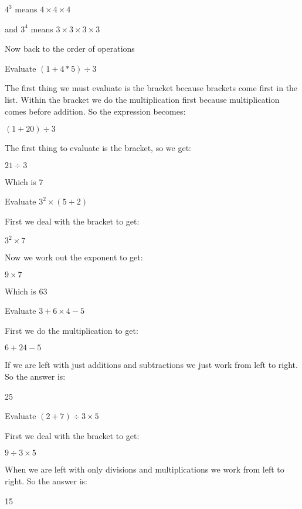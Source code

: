 $4^3$ means $4 \times 4 \times 4$

and $3^4$ means $3 \times 3 \times 3 \times 3$

Now back to the order of operations

\begin{exmp}
Evaluate $(1+ 4 * 5) \div 3$

\bigskip

The first thing we must evaluate is the bracket because brackets come first in the list.  Within the bracket we do the multiplication first because multiplication comes before addition.  So the expression becomes:

\bigskip

$(1 + 20) \div 3$

The first thing to evaluate is the bracket, so we get:

\bigskip

$21 \div 3$

\bigskip

Which is 7
\end{exmp}

\begin{exmp}
Evaluate $3^2 \times (5+2)$

\bigskip

First we deal with the bracket to get:

\bigskip

$3^2 \times 7$

\bigskip

Now we work out the exponent to get:

\bigskip

$9 \times 7$

\bigskip

Which is 63
\end{exmp}

\begin{exmp}
Evaluate $3 + 6 \times 4 - 5$

\bigskip

First we do the multiplication to get:

\bigskip

$6 + 24 - 5$

If we are left with just additions and subtractions we just work from left to right. So the answer is:

\bigskip

25
\end{exmp}

\begin{exmp}
Evaluate $(2 + 7) \div 3 \times 5$

First we deal with the bracket to get:

\bigskip

$9 \div 3 \times 5$

\bigskip

When we are left with only divisions and multiplications we work from left to right.  So the answer is:

\bigskip

15
\end{exmp}

